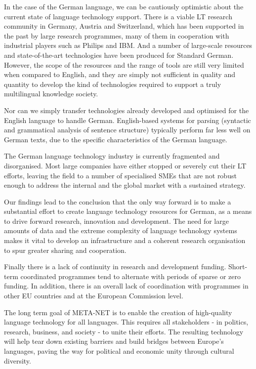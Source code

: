\documentclass[]{../../metanetpaper}
\begin{document}
\begin{Parallel}[c]{79mm}{78mm}
{    In the case of the German language, we can be cautiously optimistic about the current state of language technology support. There is a viable LT research community in Germany, Austria and Switzerland, which has been supported in the past by large research programmes, many of them in cooperation with industrial players such as Philips and IBM. And a number of large-scale resources and state-of-the-art technologies have been produced for Standard German. However, the scope of the resources and the range of tools are still very limited when compared to English, and they are simply not sufficient in quality and quantity to develop the kind of technologies required to support a truly multilingual knowledge society.

    Nor can we simply transfer technologies already developed and optimised for the English language to handle German. English-based systems for parsing (syntactic and grammatical analysis of sentence structure) typically perform far less well on German texts, due to the specific characteristics of the German language.

    The German language technology industry is currently fragmented and disorganised. Most large companies have either stopped or severely cut their LT efforts, leaving the field to a number of specialised SMEs that are not robust enough to address the internal and the global market with a sustained strategy. 

    Our findings lead to the conclusion that the only way forward is to make a substantial effort to create language technology resources for German, as a means to drive forward research, innovation and development. The need for large amounts of data and the extreme complexity of language technology systems makes it vital to develop an infrastructure and a coherent research organisation to spur greater sharing and cooperation.

Finally there is a lack of continuity in research and development funding. Short-term coordinated programmes tend to alternate with periods of sparse or zero funding. In addition, there is an overall lack of coordination with programmes in other EU countries and at the European Commission level.

The long term goal of META-NET is to enable the creation of high-quality language technology for all languages. This requires all stakeholders - in politics, research, business, and society - to unite their efforts. The resulting technology will help tear down existing barriers and build bridges between Europe’s languages, paving the way for political and economic unity through cultural diversity. 

}
\end{Parallel}
\end{document}
